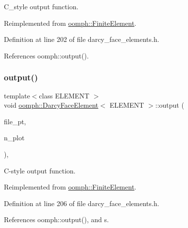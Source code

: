 C\+\_\+style output function. 



Reimplemented from \hyperlink{classoomph_1_1FiniteElement_a72cddd09f8ddbee1a20a1ff404c6943e}{oomph\+::\+Finite\+Element}.



Definition at line 202 of file darcy\+\_\+face\+\_\+elements.\+h.



References oomph\+::output().

\mbox{\label{classoomph_1_1DarcyFaceElement_a52b0382a8519d2efcb599cdd52400477}} 
\subsubsection{\texorpdfstring{output()}{output()}\hspace{0.1cm}{\footnotesize\ttfamily [4/4]}}
{\footnotesize\ttfamily template$<$class E\+L\+E\+M\+E\+NT $>$ \\
void \hyperlink{classoomph_1_1DarcyFaceElement}{oomph\+::\+Darcy\+Face\+Element}$<$ E\+L\+E\+M\+E\+NT $>$\+::output (\begin{DoxyParamCaption}\item[{F\+I\+LE $\ast$}]{file\+\_\+pt,  }\item[{const unsigned \&}]{n\+\_\+plot }\end{DoxyParamCaption})\hspace{0.3cm}{\ttfamily [inline]}, {\ttfamily [virtual]}}



C-\/style output function. 



Reimplemented from \hyperlink{classoomph_1_1FiniteElement_adfaee690bb0608f03320eeb9d110d48c}{oomph\+::\+Finite\+Element}.



Definition at line 206 of file darcy\+\_\+face\+\_\+elements.\+h.



References oomph\+::output(), and s.

\mbox{\label{classoomph_1_1DarcyFaceElement_acb4492022eed505e3b41ee47a6b3bcaa}} 
